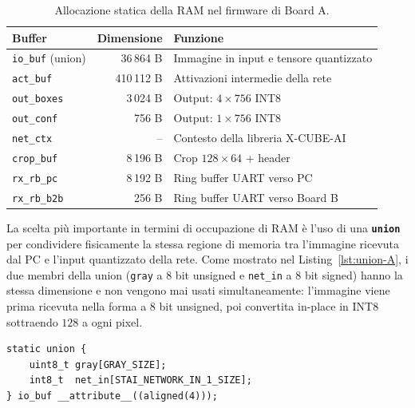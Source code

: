 \begin{table}[H]
    \centering
    \caption{Allocazione statica della RAM nel firmware di Board A.}
    \label{tab:buffer-A}
    \begin{tabular}{lrl}
        \toprule
        \textbf{Buffer} & \textbf{Dimensione} & \textbf{Funzione} \\
        \midrule
        \texttt{io\_buf} (union)   & 36\,864 B   & Immagine in input e tensore quantizzato \\
        \texttt{act\_buf}          & 410\,112 B  & Attivazioni intermedie della rete \\
        \texttt{out\_boxes}        & 3\,024 B    & Output: $4 \times 756$ INT8 \\
        \texttt{out\_conf}         & 756 B       & Output: $1 \times 756$ INT8 \\
        \texttt{net\_ctx}          & --          & Contesto della libreria X-CUBE-AI \\
        \texttt{crop\_buf}         & 8\,196 B    & Crop $128 \times 64$ + header \\
        \texttt{rx\_rb\_pc}        & 8\,192 B    & Ring buffer UART verso PC \\
        \texttt{rx\_rb\_b2b}       & 256 B       & Ring buffer UART verso Board B \\
        \bottomrule
    \end{tabular}
\end{table}

La scelta più importante in termini di occupazione di RAM è l'uso di una \texttt{\textbf{union}} per condividere fisicamente la stessa regione di memoria tra l'immagine ricevuta dal PC e l'input quantizzato della rete. Come mostrato nel Listing~\ref{lst:union-A}, i due membri della union (\texttt{gray} a 8 bit unsigned e \texttt{net\_in} a 8 bit signed) hanno la stessa dimensione e non vengono mai usati simultaneamente: l'immagine viene prima ricevuta nella forma a 8 bit unsigned, poi convertita in-place in INT8 sottraendo $128$ a ogni pixel.

\begin{lstlisting}[style=stileC, caption={Union per la condivisione del buffer di ingresso tra l'immagine ricevuta e il tensore quantizzato. Risparmia $36\,864$ byte di RAM.}, label={lst:union-A}]
static union {
    uint8_t gray[GRAY_SIZE];
    int8_t  net_in[STAI_NETWORK_IN_1_SIZE];
} io_buf __attribute__((aligned(4)));
\end{lstlisting}




